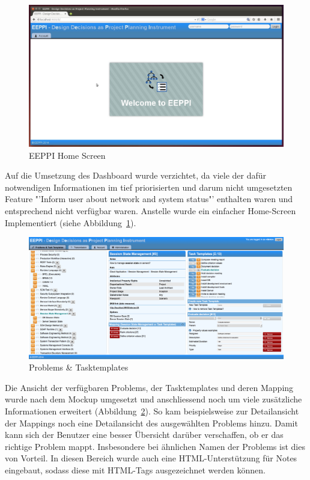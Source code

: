 		\begin{figure}[H]
			\centering
			\includegraphics[width=\linewidth]{tutorial/img/eeppiHomeScreen.jpg}
			\caption{EEPPI Home Screen}
			\label{fig:eeppiHomeScreen}
		\end{figure}	
		
		Auf die Umsetzung des Dashboard wurde verzichtet, da viele der dafür notwendigen Informationen im tief priorisierten und darum nicht umgesetzten Feature "'Inform user about network and system status"' enthalten waren und entsprechend nicht verfügbar waren.
		Anstelle wurde ein einfacher Home-Screen Implementiert (siehe Abbildung\ \ref{fig:eeppiHomeScreen}).
		
		
		\begin{figure}[H]
			\centering
			\includegraphics[width=\linewidth]{tutorial/img/eeppiDecisionsAndTaskTemplates.png}
			\caption{Problems \& Tasktemplates}
			\label{fig:eeppiDecisionsAndTaskTemplates}
		\end{figure}	
		
		Die Ansicht der verfügbaren Problems, der Tasktemplates und deren Mapping wurde nach dem Mockup umgesetzt und anschliessend noch um viele zusätzliche Informationen erweitert (Abbildung\ \ref{fig:eeppiDecisionsAndTaskTemplates}).
		So kam beispielsweise zur Detailansicht der Mappings noch eine Detailansicht des ausgewählten Problems hinzu.
		Damit kann sich der Benutzer eine besser Übersicht darüber verschaffen,
		ob er das richtige Problem mappt.
		Insbesondere bei ähnlichen Namen der Problems ist dies von Vorteil.
		In diesen Bereich wurde auch eine HTML-Unterstützung für Notes eingebaut, 
		sodass diese mit HTML-Tags ausgezeichnet werden können.
		
